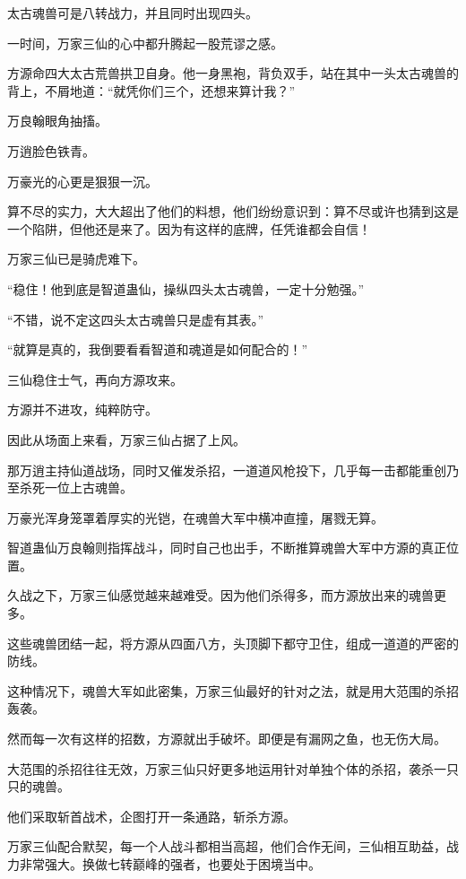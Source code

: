 
\begin{this_body}



太古魂兽可是八转战力，并且同时出现四头。

一时间，万家三仙的心中都升腾起一股荒谬之感。

方源命四大太古荒兽拱卫自身。他一身黑袍，背负双手，站在其中一头太古魂兽的背上，不屑地道：“就凭你们三个，还想来算计我？”

万良翰眼角抽搐。

万逍脸色铁青。

万豪光的心更是狠狠一沉。

算不尽的实力，大大超出了他们的料想，他们纷纷意识到：算不尽或许也猜到这是一个陷阱，但他还是来了。因为有这样的底牌，任凭谁都会自信！

万家三仙已是骑虎难下。

“稳住！他到底是智道蛊仙，操纵四头太古魂兽，一定十分勉强。”

“不错，说不定这四头太古魂兽只是虚有其表。”

“就算是真的，我倒要看看智道和魂道是如何配合的！”

三仙稳住士气，再向方源攻来。

方源并不进攻，纯粹防守。

因此从场面上来看，万家三仙占据了上风。

那万逍主持仙道战场，同时又催发杀招，一道道风枪投下，几乎每一击都能重创乃至杀死一位上古魂兽。

万豪光浑身笼罩着厚实的光铠，在魂兽大军中横冲直撞，屠戮无算。

智道蛊仙万良翰则指挥战斗，同时自己也出手，不断推算魂兽大军中方源的真正位置。

久战之下，万家三仙感觉越来越难受。因为他们杀得多，而方源放出来的魂兽更多。

这些魂兽团结一起，将方源从四面八方，头顶脚下都守卫住，组成一道道的严密的防线。

这种情况下，魂兽大军如此密集，万家三仙最好的针对之法，就是用大范围的杀招轰袭。

然而每一次有这样的招数，方源就出手破坏。即便是有漏网之鱼，也无伤大局。

大范围的杀招往往无效，万家三仙只好更多地运用针对单独个体的杀招，袭杀一只只的魂兽。

他们采取斩首战术，企图打开一条通路，斩杀方源。

万家三仙配合默契，每一个人战斗都相当高超，他们合作无间，三仙相互助益，战力非常强大。换做七转巅峰的强者，也要处于困境当中。


\end{this_body}
